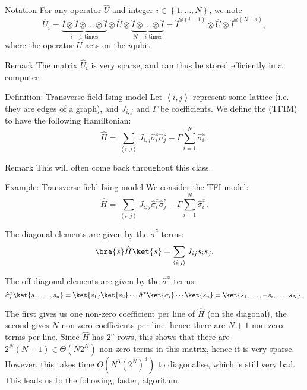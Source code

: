 \documentclass[a4paper]{article}
\begin{document}
\begin{parag}{Notation}
    For any operator $\hat{U}$ and integer $i \in \left\{1, \ldots, N\right\}$, we note
    \[\hat{U}_i = \underbrace{\hat{I} \otimes \hat{I} \otimes \ldots \otimes \hat{I}}_{i - 1 \text{ times}} \otimes \hat{U} \otimes \underbrace{\hat{I} \otimes \ldots \otimes \hat{I}}_{N - i  \text{ times}} = \hat{I}^{\otimes \left(i-1\right)} \otimes \hat{U} \otimes \hat{I}^{\otimes \left(N-i\right)},\]
    where the operator $\hat{U}$ acts on the $i$\Th qubit.

    \begin{subparag}{Remark}
        The matrix $\hat{U}_i$ is very sparse, and can thus be stored efficiently in a computer.
    \end{subparag}
\end{parag}

\begin{parag}{Definition: Transverse-field Ising model}
    Let $\left\langle i, j \right\rangle$ represent some lattice (i.e. they are edges of a graph), and $J_{i, j}$ and $\Gamma$ be coefficients. We define the  (TFIM) to have the following Hamiltonian:
    \[\hat{H} = \sum_{\left\langle i, j \right\rangle} J_{i, j} \hat{\sigma}_i^z \hat{\sigma}_j^z - \Gamma \sum_{i=1}^{N} \hat{\sigma}_i^x.\]

    \begin{subparag}{Remark}
        This will often come back throughout this class.
    \end{subparag}
\end{parag}

\begin{parag}{Example: Transverse-field Ising model}
    We consider the TFI model:
    \[\hat{H} = \sum_{\left\langle i, j \right\rangle} J_{i, j} \hat{\sigma}_i^z \hat{\sigma}_j^z - \Gamma \sum_{i=1}^{N} \hat{\sigma}_i^x.\]

    The diagonal elements are given by the $\hat{\sigma}^z$ terms: 
    \[\bra{s} \hat{H} \ket{s} = \sum_{\left\langle i, j \right\rangle} J_{i j} s_i s_j.\]

    The off-diagonal elements are given by the $\hat{\sigma}^x$ terms: 
    \[\hat{\sigma}_i^x \ket{s_1, \ldots, s_n}  = \ket{s_1}\ket{s_2} \cdots \hat{\sigma}^x \ket{\sigma_i} \cdots \ket{s_n} = \ket{s_1, \ldots, -s_i, \ldots, s_N}.\]

    The first gives us one non-zero coefficient per line of $\hat{H}$ (on the diagonal), the second gives $N$ non-zero coefficients per line, hence there are $N+1$ non-zero terms per line. Since $\hat{H}$ has $2^n$ rows, this shows that there are $2^N \left(N+1\right) \in \Theta\left(N 2^N\right)$ non-zero terms in this matrix, hence it is very sparse. However, this takes time $O\left(N^3 \left(2^N\right)^3\right)$ to diagonalise, which is still very bad. This leads us to the following, faster, algorithm.
\end{parag}
\end{document}
